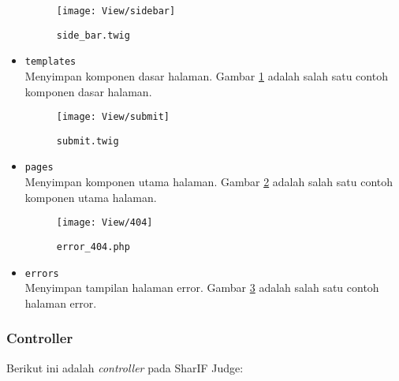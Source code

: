 \begin{itemize}
    \begin{figure}[H]
    	\centering  
    	\texttt{[image: View/sidebar]}  
    	\caption{\texttt{side\_bar.twig}}
    	\label{fig:3:viewsidebar} 
    \end{figure} 
    \item \verb|templates| \\ Menyimpan komponen dasar halaman. Gambar \ref{fig:3:viewsidebar} adalah salah satu contoh komponen dasar halaman.
    
    \begin{figure}[H]
    	\centering  
    	\texttt{[image: View/submit]}  
    	\caption{\texttt{submit.twig}}
    	\label{fig:3:viewsubmit} 
    \end{figure} 
    \item \verb|pages| \\ Menyimpan komponen utama halaman. Gambar \ref{fig:3:viewsubmit} adalah salah satu contoh komponen utama halaman.
    
    \begin{figure}[H]
    	\centering  
    	\texttt{[image: View/404]}  
    	\caption{\texttt{error\_404.php}}
    	\label{fig:3:view404} 
    \end{figure} 
	\item \verb|errors| \\ Menyimpan tampilan halaman error. Gambar \ref{fig:3:view404} adalah salah satu contoh halaman error.
\end{itemize}

\subsubsection{Controller}

Berikut ini adalah \textit{controller} pada SharIF Judge:

